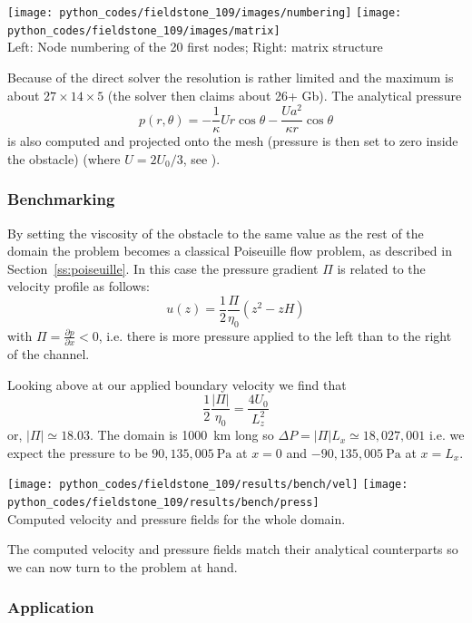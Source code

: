 \begin{center}
\texttt{[image: python\_codes/fieldstone\_109/images/numbering]}
\texttt{[image: python\_codes/fieldstone\_109/images/matrix]}\\
{\captionfont Left: Node numbering of the 20 first nodes; Right: matrix structure}
\end{center}

Because of the direct solver the resolution is rather limited and the maximum is 
about $27\times 14 \times 5$ (the solver then claims about 26+ Gb). The analytical pressure  
\[
p(r,\theta) = 
-\frac{1}{\kappa} U r  \cos \theta
 -\frac{U a^2 }{\kappa r}  \cos \theta
\]
is also computed and projected onto the mesh (pressure is then set to zero inside the 
obstacle) (where $U=2U_0/3$, see ). 

\subsubsection*{Benchmarking}

By setting the viscosity of the obstacle to the same value as the rest 
of the domain the problem becomes a classical Poiseuille flow problem, as 
described in Section~\ref{ss:poiseuille}.
In this case the pressure gradient $\Pi$ is related to the velocity profile 
as follows:
\[
u(z) = \frac{1}{2}\frac{\Pi}{\eta_0} (z^2 - zH)
\]
with $\Pi=\frac{\partial p}{\partial x}<0$, i.e. 
there is more pressure applied to the left than to the right of the channel.

Looking above at our applied boundary velocity we find that 
\[
\frac{1}{2}\frac{|\Pi|}{\eta_0} = \frac{4U_0}{L_z^2}
\]
or, $|\Pi|\simeq 18.03$. The domain is 1000~\si{\km} long 
so $\Delta P = |\Pi| L_x \simeq 18,027,001$ i.e. we expect the pressure to 
be $90,135,005~\si{\pascal}$ at $x=0$ and $-90,135,005~\si{\pascal}$ at $x=L_x$. 

\begin{center}
\texttt{[image: python\_codes/fieldstone\_109/results/bench/vel]}
\texttt{[image: python\_codes/fieldstone\_109/results/bench/press]}\\
{\captionfont Computed velocity and pressure fields for the whole domain.}
\end{center}

The computed velocity and pressure fields match their analytical counterparts 
so we can now turn to the problem at hand.

\subsubsection*{Application}

